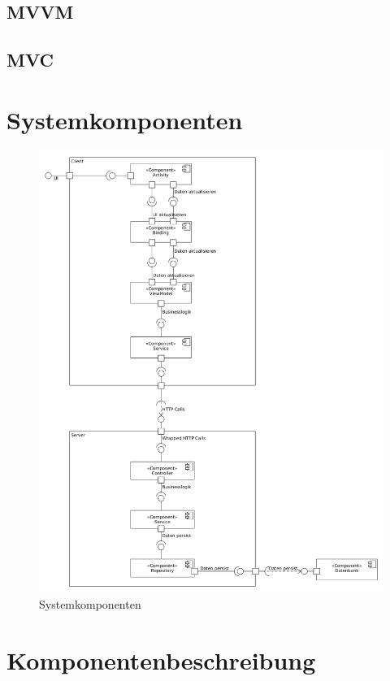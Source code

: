 \documentclass[a4paper]{scrreprt}
\begin{document}
		\subsection{MVVM}
			
		\subsection{MVC}
			
		
	\section{Systemkomponenten}
	      \begin{figure}[H]
	       \centering
	       \includegraphics[scale = .35]{systemkomponenten.png}
	       \caption{Systemkomponenten}
	      \end{figure}
      
      \newpage
	 
	 \section{Komponentenbeschreibung}
\end{document}
